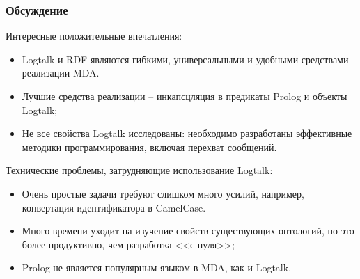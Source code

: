 \documentclass[handout]{beamer}
\begin{document}
\begin{frame}
  \frametitle{Обсуждение}
Интересные положительные впечатления:
\begin{itemize}
\item Logtalk и RDF являются гибкими, универсальными и удобными средствами реализации MDA.
\item Лучшие средства реализации -- инкапсцляция в предикаты Prolog и объекты Logtalk;
\item Не все свойства Logtalk исследованы: необходимо разработаны эффективные методики программирования, включая перехват сообщений.
\end{itemize}
Технические проблемы, затрудняющие использование Logtalk:
\begin{itemize}
\item Очень простые задачи требуют слишком много усилий, например, конвертация идентификатора в CamelCase.
\item Много времени уходит на изучение свойств существующих онтологий, но это более продуктивно, чем разработка <<с нуля>>;
\item Prolog не является популярным языком в MDA, как и Logtalk.
\end{itemize}
\end{frame}

\end{document}
